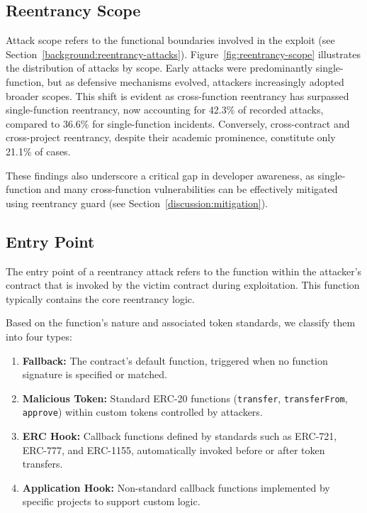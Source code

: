 

\subsection{Reentrancy Scope}
\label{quantitative:reentrancy-scope}

Attack scope refers to the functional boundaries involved in the exploit (see Section~\ref{background:reentrancy-attacks}). Figure~\ref{fig:reentrancy-scope} illustrates the distribution of attacks by scope. Early attacks were predominantly single-function, but as defensive mechanisms evolved, attackers increasingly adopted broader scopes. This shift is evident as cross-function reentrancy has surpassed single-function reentrancy, now accounting for 42.3\% of recorded attacks, compared to 36.6\% for single-function incidents. Conversely, cross-contract and cross-project reentrancy, despite their academic prominence, constitute only 21.1\% of cases.

These findings also underscore a critical gap in developer awareness, as single-function and many cross-function vulnerabilities can be effectively mitigated using reentrancy guard (see Section~\ref{discussion:mitigation}).



\subsection{Entry Point}
\label{quantitative:entry-point}

The entry point of a reentrancy attack refers to the function within the attacker's contract that is invoked by the victim contract during exploitation. This function typically contains the core reentrancy logic.

Based on the function's nature and associated token standards, we classify them into four types:
\begin{enumerate}
    \item \textbf{Fallback:} The contract's default function, triggered when no function signature is specified or matched.
    \item \textbf{Malicious Token:} Standard ERC-20 functions (\eg \lstinline{transfer}, \lstinline{transferFrom}, \lstinline{approve}) within custom tokens controlled by attackers.
    \item \textbf{ERC Hook:} Callback functions defined by standards such as ERC-721, ERC-777, and ERC-1155, automatically invoked before or after token transfers.
    \item \textbf{Application Hook:} Non-standard callback functions implemented by specific projects to support custom logic.
\end{enumerate}

